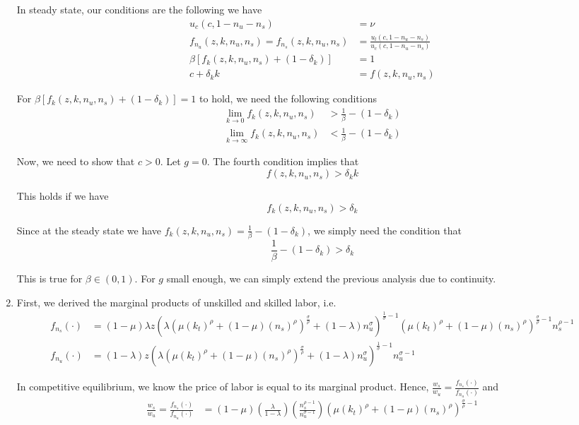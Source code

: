 \documentclass[12pt]{article}
\newcommand{\1}{{\bf 1}} %
\begin{document}
\begin{enumerate}[(1)]
	In steady state, our conditions are the following we have
				\begin{align*}
u_c(c,1-n_u-n_s)&=\nu\\
f_{n_u}(z,k,n_{u},n_{s})=f_{n_s}(z,k,n_{u},n_{s}) &=\frac{u_l(c,1-n_u-n_s)}{u_c(c,1-n_u-n_s)}\\
\beta [ f_k(z,k,n_{u},n_{s})+(1-\delta_k)]& =1 \\
c+\delta_kk  & = f(z,k,n_{u},n_{s})
\end{align*}



	For $\beta [ f_k(z,k,n_{u},n_{s})+(1-\delta_k)] =1$ to hold, we need the following conditions
	\begin{align*}
\lim_{k\to 0} f_k(z,k,n_{u},n_{s})& > \frac{1}{\beta}-(1-\delta_k)\\
\lim_{k\to \infty} f_k(z,k,n_{u},n_{s})&<\frac{1}{\beta}-(1-\delta_k)
\end{align*}


Now, we need to show that $c>0$. Let $g=0$. The fourth condition implies that
\[
f(z,k,n_{u},n_{s})>\delta_k k
\]

This holds if we have
\[
f_k(z,k,n_{u},n_{s})>\delta_k 
\]


Since at the steady state we have $ f_k(z,k,n_{u},n_{s})= \frac{1}{\beta}-(1-\delta_k)$, we simply need the condition that 
\[
\frac{1}{\beta}-(1-\delta_k)>\delta_k
\]

This is true for $\beta\in (0,1)$. For $g$ small enough, we can simply extend the previous analysis due to continuity.
	
	\item 
	First, we derived the marginal products of unskilled and skilled labor, i.e.
		\begin{equation*}
	\begin{aligned}
	f_{n_s}(\cdot) &= (1-\mu) \lambda z (\lambda(\mu(k_t)^{\rho}+(1-\mu)(n_s)^{\rho})^{\frac{\sigma}{\rho}}+(1-\lambda)n_u^{\sigma})^{\frac{1}{\sigma}-1}(\mu(k_t)^{\rho}+(1-\mu)(n_s)^{\rho})^{\frac{\sigma}{\rho}-1}n_s^{\rho-1}\\
	f_{n_u}(\cdot) &= (1- \lambda) z (\lambda(\mu(k_t)^{\rho}+(1-\mu)(n_s)^{\rho})^{\frac{\sigma}{\rho}}+(1-\lambda)n_u^{\sigma})^{\frac{1}{\sigma}-1}n_u^{\sigma-1}
	\end{aligned}
	\end{equation*}
	
	In competitive equilibrium, we know the price of labor is equal to its marginal product. Hence, $\frac{w_s}{w_u}=\frac{f_{n_s}(\cdot)}{f_{n_u}(\cdot)}$ and
			\begin{equation*}
	\begin{aligned}
	\frac{w_s}{w_u}=\frac{f_{n_s}(\cdot)}{f_{n_u}(\cdot)} &= (1-\mu)\left( \frac{\lambda}{1-\lambda}\right)  \left( \frac{n_s^{\rho-1}}{n_u^{\sigma-1}}\right)  (\mu(k_t)^{\rho}+(1-\mu)(n_s)^{\rho})^{\frac{\sigma}{\rho}-1}
	\end{aligned}
	\end{equation*}
	

\end{enumerate}
\end{document}
